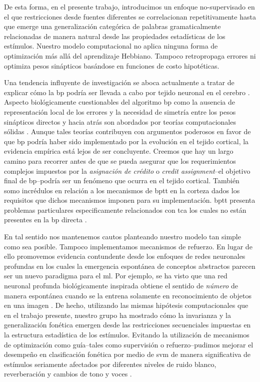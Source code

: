 {De esta forma, en el presente trabajo, introducimos un enfoque no-supervisado en el que restricciones desde fuentes diferentes se correlacionan repetitivamente hasta que emerge una generalización categórica de palabras gramaticalmente relacionadas de manera natural desde las propiedades estadísticas de los estímulos.
Nuestro modelo computacional no aplica ninguna forma de optimización más allá del aprendizaje Hebbiano. Tampoco retropropaga errores ni optimiza pesos sinápticos basándose en funciones de costo hipotéticas.


Una tendencia influyente de investigación se aboca actualmente a tratar de explicar cómo la \gls{bp} podría ser llevada a cabo por tejido neuronal en el cerebro \cite{WHITTINGTON2019235}.
Aspecto biológicamente cuestionables del algoritmo \gls{bp} como la ausencia de representación local de los errores y la necesidad de simetría entre los pesos sinápticos directos y hacia atrás son abordados por teorías computacionales sólidas \cite{10.7554/eLife.22901, Lillicrap_2016}.
Aunque tales teorías contribuyen con argumentos poderosos en favor de que \gls{bp} podría haber sido implementado por la evolución en el tejido cortical, la evidencia empírica está lejos de ser concluyente.
Creemos que hay un largo camino para recorrer antes de que se pueda asegurar que los requerimientos complejos impuestos por la \emph{asignación de crédito} o \emph{credit assignment}--el objetivo final de \gls{bp}--podría ser un fenómeno que ocurra en el tejido cortical.
También somo incrédulos en relación a los mecanismos de \gls{bptt} en la corteza dados los requisitos que dichos mecanismos imponen para su implementación.
\gls{bptt} presenta problemas particulares especificamente relacionados con \gls{tca} los cuales no están presentes en la \gls{bp} directa \cite{LILLICRAP201982}.


En tal sentido nos mantenemos cautos planteando nuestro modelo tan simple como sea posible. Tampoco implementamos mecanismos de refuerzo.
En lugar de ello promovemos evidencia contundente desde los enfoques de redes neuronales profundas en los cuales la emergencia espontánea de conceptos abstractos parecen ser un nuevo paradigma para el \gls{ml}.
Por ejemplo, se ha visto que una red neuronal profunda biológicamente inspirada obtiene el sentido de \emph{número} de manera espontánea cuando se la entrena solamente en reconocimiento de objetos en una imagen \cite{Nasreaav7903}.
De hecho, utilizando las mismas hipótesis computacionales que en el trabajo presente, nuestro grupo ha mostrado cómo la invarianza y la generalización fonética emergen desde las restricciones secuenciales impuestas en la estructura estadística de los estímulos.
Evitando la utilización de mecanismos de optimización como guía--tales como supervisión o refuerzo--pudimos mejorar el desempeño en clasificación fonética por medio de \gls{svm} de manera significativa de estímulos seriamente afectados por diferentes niveles de ruido blanco, reverberación y cambios de tono y voces \cite{10.1371/journal.pone.0217966}.

}
